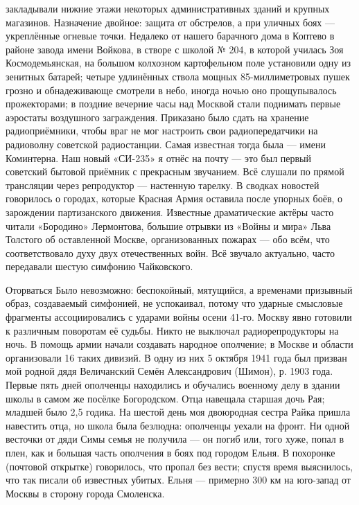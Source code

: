 \label{35-1}
закладывали нижние этажи некоторых административных зданий и крупных магазинов. Назначение двойное: защита от обстрелов, а при уличных боях — укреплённые огневые точки. Недалеко от нашего барачного дома в Коптево в районе завода имени Войкова, в створе с школой № 204, в которой училась Зоя Космодемьянская, на большом колхозном картофельном поле установили одну из зенитных батарей; четыре удлинённых ствола мощных 85-миллиметровых пушек грозно и обнадеживающе смотрели в небо, иногда ночью оно прощупывалось прожекторами; в поздние вечерние часы над Москвой стали поднимать первые аэростаты воздушного заграждения. Приказано было сдать на хранение радиоприёмники, чтобы враг не мог настроить свои радиопередатчики на радиоволну советской радиостанции. Самая известная тогда была — имени Коминтерна. Наш новый «СИ-235» я отнёс на почту — это был первый советский бытовой приёмник с прекрасным звучанием. Всё слушали по прямой трансляции через репродуктор — настенную тарелку. В сводках новостей говорилось о городах, которые Красная Армия оставила после упорных боёв, о зарождении партизанского движения. Известные драматические актёры часто читали «Бородино» Лермонтова, большие отрывки из «Войны и мира» Льва Толстого об оставленной Москве, организованных пожарах — обо всём, что соответствовало духу двух отечественных войн. Всё звучало актуально, часто передавали шестую симфонию Чайковского.

\label{36-1}
Оторваться Было невозможно: беспокойный, мятущийся, а временами призывный образ, создаваемый симфонией, не успокаивал, потому что ударные смысловые фрагменты ассоциировались с ударами войны осени 41-го. Москву явно готовили к различным поворотам её судьбы. Никто не выключал радиорепродукторы на ночь. В помощь армии начали создавать народное ополчение; в Москве и области организовали 16 таких дивизий. В одну из них 5 октября 1941 года был призван мой родной дядя Величанский Семён Александрович (Шимон), р. 1903 года. Первые пять дней ополченцы находились и обучались военному делу в здании школы в самом же посёлке Богородском. Отца навещала старшая дочь Рая; младшей было 2,5 годика. На шестой день моя двоюродная сестра Райка пришла навестить отца, но школа была безлюдна: ополченцы уехали на фронт. Ни одной весточки от дяди Симы семья не получила — он погиб или, того хуже, попал в плен, как и большая часть ополчения в боях под городом Ельня. В похоронке (почтовой открытке) говорилось, что пропал без вести; спустя время выяснилось, что так писали об известных убитых. Ельня — примерно 300 км на юго-запад от Москвы в сторону города Смоленска.

